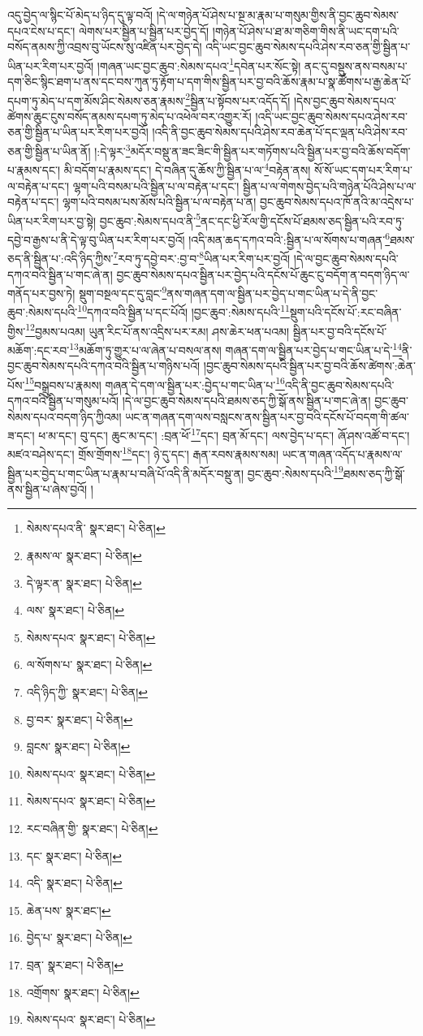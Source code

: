 འདུ་བྱེད་ལ་སྙིང་པོ་མེད་པ་ཉིད་དུ་ལྟ་བའོ། །དེ་ལ་གཉེན་པོ་ཤེས་པ་སྔ་མ་རྣམ་པ་གསུམ་གྱིས་ནི་བྱང་ཆུབ་སེམས་དཔའ་ངེས་པ་དང་། ལེགས་པར་སྦྱིན་པ་སྦྱིན་པར་བྱེད་དོ། །གཉེན་པོ་ཤེས་པ་ཐ་མ་གཅིག་གིས་ནི་ཡང་དག་པའི་བསོད་ནམས་ཀྱི་འབྲས་བུ་ཡོངས་སུ་འཛིན་པར་བྱེད་དེ། འདི་ཡང་བྱང་ཆུབ་སེམས་དཔའི་ཤེས་རབ་ཅན་གྱི་སྦྱིན་པ་ཡིན་པར་རིག་པར་བྱའོ། །གཞན་ཡང་བྱང་ཆུབ་:སེམས་དཔའ་\footnote{སེམས་དཔའ་ནི་  སྣར་ཐང་།  པེ་ཅིན། }དབེན་པར་སོང་སྟེ། ནང་དུ་བསྡུས་ནས་བསམ་པ་དག་ཅིང་སྙིང་ཐག་པ་ནས་དང་བས་ཀུན་ཏུ་རྟོག་པ་དག་གིས་སྦྱིན་པར་བྱ་བའི་ཆོས་རྣམ་པ་སྣ་ཚོགས་པ་རྒྱ་ཆེན་པོ་དཔག་ཏུ་མེད་པ་དག་མོས་ཤིང་སེམས་ཅན་རྣམས་\footnote{རྣམས་ལ་  སྣར་ཐང་།  པེ་ཅིན། }སྦྱིན་པ་སྟོབས་པར་འདོད་དོ། །དེས་བྱང་ཆུབ་སེམས་དཔའ་ཚེགས་ཆུང་ངུས་བསོད་ནམས་དཔག་ཏུ་མེད་པ་འཕེལ་བར་འགྱུར་རོ། །འདི་ཡང་བྱང་ཆུབ་སེམས་དཔའ་ཤེས་རབ་ཅན་གྱི་སྦྱིན་པ་ཡིན་པར་རིག་པར་བྱའོ། །འདི་ནི་བྱང་ཆུབ་སེམས་དཔའི་ཤེས་རབ་ཆེན་པོ་དང་ལྡན་པའི་ཤེས་རབ་ཅན་གྱི་སྦྱིན་པ་ཡིན་ནོ། །:དེ་ལྟར་\footnote{དེ་ལྟར་ན་  སྣར་ཐང་།  པེ་ཅིན། }མདོར་བསྡུ་ན་ཟང་ཟིང་གི་སྦྱིན་པར་གཏོགས་པའི་སྦྱིན་པར་བྱ་བའི་ཆོས་བདོག་པ་རྣམས་དང་། མི་བདོག་པ་རྣམས་དང་། དེ་བཞིན་དུ་ཆོས་ཀྱི་སྦྱིན་པ་ལ་\footnote{ལས་  སྣར་ཐང་།  པེ་ཅིན། }བརྟེན་ནས། སོ་སོ་ཡང་དག་པར་རིག་པ་ལ་བརྟེན་པ་དང་། ལྷག་པའི་བསམ་པའི་སྦྱིན་པ་ལ་བརྟེན་པ་དང་། སྦྱིན་པ་ལ་གེགས་བྱེད་པའི་གཉེན་པོའི་ཤེས་པ་ལ་བརྟེན་པ་དང་། ལྷག་པའི་བསམ་པས་མོས་པའི་སྦྱིན་པ་ལ་བརྟེན་པ་ན། བྱང་ཆུབ་སེམས་དཔའ་ཁོ་ནའི་མ་འདྲེས་པ་ཡིན་པར་རིག་པར་བྱ་སྟེ། བྱང་ཆུབ་:སེམས་དཔའ་ནི་\footnote{སེམས་དཔའ་  སྣར་ཐང་།  པེ་ཅིན། }ནང་དང་ཕྱི་རོལ་གྱི་དངོས་པོ་ཐམས་ཅད་སྦྱིན་པའི་རབ་ཏུ་དབྱེ་བ་རྒྱས་པ་ནི་དེ་ལྟ་བུ་ཡིན་པར་རིག་པར་བྱའོ། །འདི་མན་ཆད་དཀའ་བའི་:སྦྱིན་པ་ལ་སོགས་པ་གཞན་\footnote{ལ་སོགས་པ་  སྣར་ཐང་།  པེ་ཅིན། }ཐམས་ཅད་ནི་སྦྱིན་པ་:འདི་ཉིད་ཀྱིས་\footnote{འདི་ཉིད་ཀྱི་  སྣར་ཐང་།  པེ་ཅིན། }རབ་ཏུ་དབྱེ་བར་:བྱ་བ་\footnote{བྱ་བར་  སྣར་ཐང་།  པེ་ཅིན། }ཡིན་པར་རིག་པར་བྱའོ། །དེ་ལ་བྱང་ཆུབ་སེམས་དཔའི་དཀའ་བའི་སྦྱིན་པ་གང་ཞེ་ན། བྱང་ཆུབ་སེམས་དཔའ་སྦྱིན་པར་བྱེད་པའི་དངོས་པོ་ཆུང་ངུ་བདོག་ན་བདག་ཉིད་ལ་གནོད་པར་བྱས་ཏེ། སྡུག་བསྔལ་དང་དུ་བླང་\footnote{བླངས་  སྣར་ཐང་།  པེ་ཅིན། }ནས་གཞན་དག་ལ་སྦྱིན་པར་བྱེད་པ་གང་ཡིན་པ་དེ་ནི་བྱང་ཆུབ་:སེམས་དཔའི་\footnote{སེམས་དཔའ་  སྣར་ཐང་།  པེ་ཅིན། }དཀའ་བའི་སྦྱིན་པ་དང་པོའོ། །བྱང་ཆུབ་:སེམས་དཔའི་\footnote{སེམས་དཔའ་  སྣར་ཐང་།  པེ་ཅིན། }སྡུག་པའི་དངོས་པོ་:རང་བཞིན་གྱིས་\footnote{རང་བཞིན་གྱི་  སྣར་ཐང་།  པེ་ཅིན། }བྱམས་པའམ། ཡུན་རིང་པོ་ནས་འདྲིས་པར་རམ། ཤས་ཆེར་ཕན་པའམ། སྦྱིན་པར་བྱ་བའི་དངོས་པོ་མཆོག་:དང་རབ་\footnote{དང་  སྣར་ཐང་།  པེ་ཅིན། }མཆོག་ཏུ་གྱུར་པ་ལ་ཞེན་པ་བསལ་ནས། གཞན་དག་ལ་སྦྱིན་པར་བྱེད་པ་གང་ཡིན་པ་དེ་\footnote{འདི་  སྣར་ཐང་།  པེ་ཅིན། }ནི་བྱང་ཆུབ་སེམས་དཔའི་དཀའ་བའི་སྦྱིན་པ་གཉིས་པའོ། །བྱང་ཆུབ་སེམས་དཔའི་སྦྱིན་པར་བྱ་བའི་ཆོས་ཚེགས་:ཆེན་པོས་\footnote{ཆེན་པས་  སྣར་ཐང་། }བསྒྲུབས་པ་རྣམས། གཞན་དེ་དག་ལ་སྦྱིན་པར་:བྱེད་པ་གང་ཡིན་པ་\footnote{བྱེད་པ་  སྣར་ཐང་།  པེ་ཅིན། }འདི་ནི་བྱང་ཆུབ་སེམས་དཔའི་དཀའ་བའི་སྦྱིན་པ་གསུམ་པའོ། །དེ་ལ་བྱང་ཆུབ་སེམས་དཔའི་ཐམས་ཅད་ཀྱི་སྒོ་ནས་སྦྱིན་པ་གང་ཞེ་ན། བྱང་ཆུབ་སེམས་དཔའ་བདག་ཉིད་ཀྱིའམ། ཡང་ན་གཞན་དག་ལས་བསླངས་ནས་སྦྱིན་པར་བྱ་བའི་དངོས་པོ་བདག་གི་ཚལ་ཟ་དང་། ཕ་མ་དང་། བུ་དང་། ཆུང་མ་དང་། :བྲན་ཕོ་\footnote{བྲན་  སྣར་ཐང་།  པེ་ཅིན། }དང་། བྲན་མོ་དང་། ལས་བྱེད་པ་དང་། ཞོ་ཤས་འཚོ་བ་དང་། མཛའ་བཤེས་དང་། གྲོས་གྲོགས་\footnote{འགྲོགས་  སྣར་ཐང་།  པེ་ཅིན། }དང་། ཉེ་དུ་དང་། རྒན་རབས་རྣམས་སམ། ཡང་ན་གཞན་འདོད་པ་རྣམས་ལ་སྦྱིན་པར་བྱེད་པ་གང་ཡིན་པ་རྣམ་པ་བཞི་པོ་འདི་ནི་མདོར་བསྡུ་ན། བྱང་ཆུབ་:སེམས་དཔའི་\footnote{སེམས་དཔའ་  སྣར་ཐང་།  པེ་ཅིན། }ཐམས་ཅད་ཀྱི་སྒོ་ནས་སྦྱིན་པ་ཞེས་བྱའོ། །
